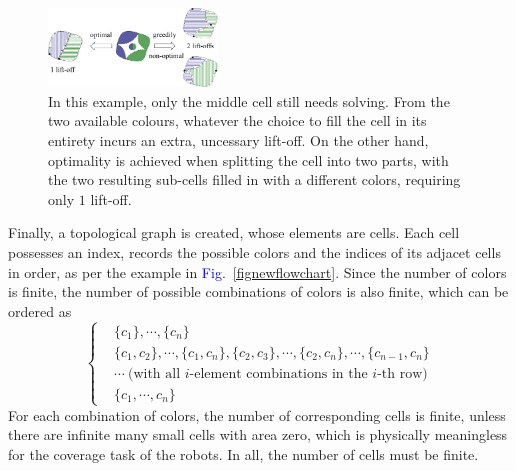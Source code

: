 \documentclass[journal]{IEEEtran}
\begin{document}
\begin{figure}[t]
\centering
\includegraphics[width = 0.4\textwidth]{figures/other_figures/simple_3}
\caption{
In this example, only the middle cell still needs solving. From the two available colours, whatever the choice to fill the cell in its entirety incurs an extra, uncessary lift-off. On the other hand, optimality is achieved when splitting the cell into two parts, 
with the two resulting sub-cells filled in with a different colors, requiring only $1$ lift-off. 
}\label{figsimpleexample}
\end{figure}


Finally, a topological graph is created, whose elements are cells. Each cell possesses an index, records the possible colors 
and the indices of its adjacet cells in order, as per the example in 
\textcolor{blue}{Fig.~\ref{fignewflowchart}. }
Since the number of colors is finite, the number of possible combinations of colors is also finite, which can be ordered as
$$\left\{
\begin{aligned}
&\{c_1\}, \cdots, \{c_n\}\\
&\{c_1, c_2\}, \cdots, \{c_1, c_n\}, \{c_2, c_3\}, \cdots, \{c_2, c_n\}, \cdots, \{c_{n-1}, c_n\}\\
&\cdots\ \mbox{(with all $i$-element combinations in the $i$-th row)}\\
&\{c_1, \cdots, c_n\}
\end{aligned}
\right.$$
For each combination of colors, the number of corresponding cells is finite, unless there are infinite many small cells with area zero, which is physically meaningless for the coverage task of the robots. In all, the number of cells must be finite. 
\end{document}
